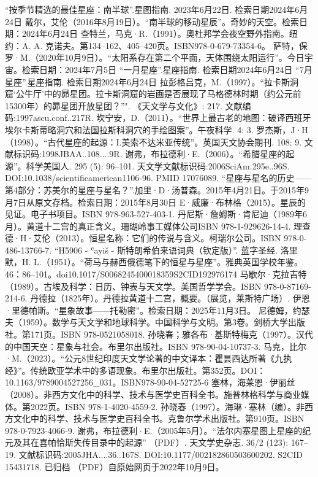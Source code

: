 \begin{enumerate}
 “按季节精选的最佳星座：南半球”.星图指南. 2023年6月22日. 检索日期2024年6月24日
 戴尔，艾伦（2016年8月19日）。“南半球的移动星辰”。奇妙的天空。检索日期：2024年6月24日
 查特兰，马克·R.（1991）。奥杜邦学会夜空野外指南。纽约：A. A. 克诺夫。第134–162、405–420页。ISBN978-0-679-73354-6。
 萨特，保罗·M.（2020年10月9日）。“太阳系存在第二个平面，天体围绕太阳运行”。今日宇宙。检索日期：2024年7月5日
 “一月星座”.星座指南. 检索日期2024年6月24日
 “7月星座”.星座指南. 检索日期2024年6月24日
 拉彭格吕克，M.（1997）。“拉卡斯洞窟‘公牛厅’中的昴星团。拉卡斯洞窟的岩画是否展现了马格德林时期（约公元前15300年）的昴星团开放星团？”". 《天文学与文化》: 217. 文献编码:1997ascu.conf..217R.
 坎宁安，D.（2011）。“世界上最古老的地图：破译西班牙埃尔卡斯蒂略洞穴和法国拉斯科洞穴的手绘图案”。午夜科学. 4: 3.
 罗杰斯，J·H（1998）。“古代星座的起源：I.美索不达米亚传统”。英国天文协会期刊. 108: 9. 文献标识码:1998JBAA..108....9R.
 谢弗，布拉德利·E.（2006）。“希腊星座的起源”。科学美国人. 295 (5): 96–101. 天文学文献标识码:2006SciAm.295e..96S. DOI:10.1038/scientificamerican1106-96. PMID 17076089.
 “星座与星名的历史——第4部分：苏美尔的星座与星名？”.加里·D·汤普森。2015年4月21日。于2015年9月7日从原文存档。检索日期：2015年8月30日
 E·威廉·布林格（2015）。星辰的见证。电子书项目。ISBN 978-963-527-403-1.
 丹尼斯·詹姆斯·肯尼迪（1989年6月）。黄道十二宫的真正含义。珊瑚岭事工媒体公司ISBN 978-1-929626-14-4.
 理查德·H·艾伦（2013）。恒星名称：它们的传说与含义。柯瑞尔公司。ISBN 978-0-486-13766-7.
 “H5906 - ʿayiš - 斯特朗希伯来语词典（钦定版）”. 蓝字圣经.
 洛里默，H. L.（1951）。“荷马与赫西俄德笔下的恒星与星座”。雅典英国学校年鉴。46：86–101。doi10.1017/S0068245400018359S2CID192976174
 马歇尔·克拉吉特（1989）。古埃及科学：日历、钟表与天文学。美国哲学学会。ISBN 978-0-87169-214-6.
 丹德拉（1825年）。丹德拉黄道十二宫，概要。（展览，莱斯特广场）.
 伊恩·里德帕斯。“星象故事——托勒密”。检索日期：2025年11月3日。
 尼德姆，约瑟夫（1959）。数学与天文学和地球科学。中国科学与文明。第3卷。剑桥大学出版社。第171页。ISBN 978-0521058018.
 孙晓春；雅各布·基斯特梅克（1997）。汉代的中国天空：星象与社会。布里尔出版社。ISBN 978-90-04-10737-3.
 马克，比尔·M.（2023）。“公元8世纪印度天文学论著的中文译本：瞿昙西达所著《九执经》”。传统欧亚学术中的多语现象。布里尔出版社。第352页。DOI：10.1163/9789004527256_031。ISBN978-90-04-52725-6
 塞林，海莱恩·伊丽丝（2008）。非西方文化中的科学、技术与医学史百科全书。施普林格科学与商业媒体。第2022页。ISBN 978-1-4020-4559-2.
 孙晓春（1997）。海琳·塞林（编）。非西方文化中的科学、技术与医学史百科全书。克鲁尔学术出版社。第910页。ISBN 978-0-7923-4066-9.
 谢弗，布拉德利·E.（2005年5月）。“法尔内塞星图上星座的纪元及其在喜帕恰斯失传目录中的起源” （PDF）. 天文学史杂志. 36/2 (123): 167–19. 文献标识码:2005JHA....36..167S. DOI:10.1177/002182860503600202. S2CID 15431718. 已归档 （PDF）自原始网页于2022年10月9日。

\end{enumerate}
